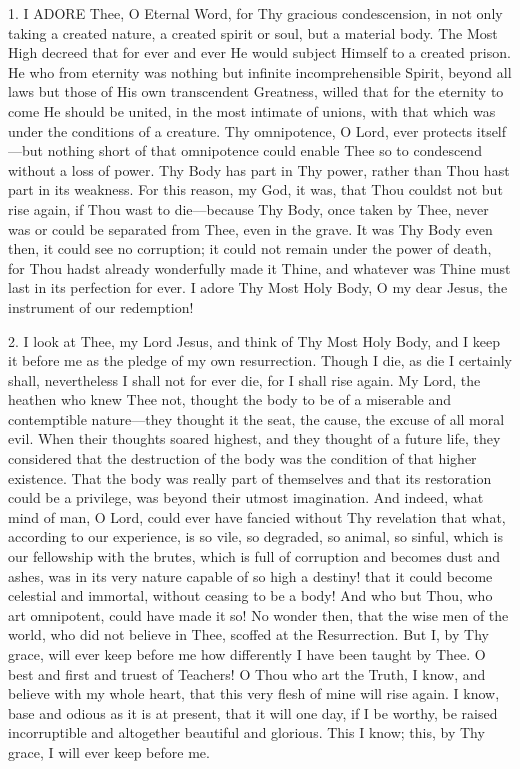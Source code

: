 

1. I ADORE
Thee, O Eternal Word, for Thy gracious condescension, in not only taking
a created nature, a created spirit or soul, but a material body. The
Most High decreed that for ever and ever He would subject Himself to a
created prison. He who from eternity was nothing but infinite
incomprehensible Spirit, beyond all laws but those of His own
transcendent Greatness, willed that for the eternity to come He should
be united, in the most intimate of unions, with that which was under the
conditions of a creature. Thy omnipotence, O Lord, ever protects
itself—but nothing short of that omnipotence could enable Thee so to
condescend without a loss of power. Thy Body has part in Thy power,
rather than Thou hast part in its weakness. For this reason, my God, it
was, that Thou couldst not but rise again, if Thou wast to die—because
Thy Body, once taken by Thee, never was or could be separated from Thee,
even in the grave. It was Thy Body even then, it could see no
corruption; it could not remain under the power of death, for Thou hadst
already wonderfully made it Thine, and whatever was Thine must last in
its perfection for ever. I adore Thy Most Holy Body, O my dear Jesus,
the instrument of our redemption!

2. I look at Thee, my Lord
Jesus, and think of Thy Most Holy Body, and I keep it before me as the
pledge of my own resurrection. Though I die, as die I certainly shall,
nevertheless I shall not for ever die, for I shall rise again. My Lord,
the heathen who knew Thee not, thought the body to be of a miserable and
contemptible nature—they thought it the seat, the cause, the excuse of
all moral evil. When their thoughts soared highest, and they thought of
a future life, they considered that the destruction of the body was the
condition of that higher existence. That the body was really part of
themselves and that its restoration could be a privilege, was beyond
their utmost imagination. And indeed, what mind of man, O Lord, could
ever have fancied without Thy revelation that what, according to our
experience, is so vile, so degraded, so animal, so sinful, which is our
fellowship with the brutes, which is full of corruption and becomes dust
and ashes, was in its very nature capable of so high a destiny! that it
could become celestial and immortal, without ceasing to be a body! And
who but Thou, who art omnipotent, could have made it so! No wonder then,
that the wise men of the world, who did not believe in Thee, scoffed at
the Resurrection. But I, by Thy grace, will ever keep before me how
differently I have been taught by Thee. O best and first and
truest of Teachers! O Thou who art the Truth, I know, and believe with
my whole heart, that this very flesh of mine will rise again. I know,
base and odious as it is at present, that it will one day, if I be
worthy, be raised incorruptible and altogether beautiful and glorious.
This I know; this, by Thy grace, I will ever keep before me.

